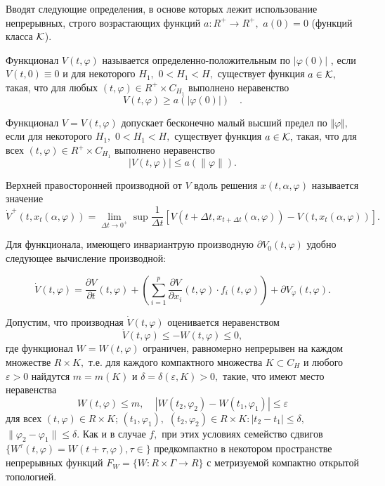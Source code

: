 	Вводят следующие
	определения, в основе которых лежит использование непрерывных,
	строго возрастающих функций
	$a:R^+\to R^+,$ $a(0)=0$ (функций класса $\cal K$).
	
	\begin{definition}\label{d2.9} Функционал $V(t,\varphi )$ называется
		определенно-положительным по $|\varphi(0)|$ , если $V(t,0)\equiv 0$ и для некоторого $H_1,$
		$0<H_1<H,$ существует функция $a\in {\cal K},$ такая, что для
		любых $(t,\varphi) \in R^+\times C_{H_1}$ выполнено неравенство $$
		V(t,\varphi )\ge a(|\varphi (0)|)\quad. $$
	\end{definition}
	
	\begin{definition}\label{d2.10} Функционал $V=V(t,\varphi )$ допускает бесконечно
		малый высший предел по $\Vert \varphi \Vert,$ если для некоторого
		$H_1,$ $0<H_1<H,$ существует функция $a\in {\cal K},$ такая, что
		для всех  $(t,\varphi) \in R^+\times C_{H_1}$ выполнено
		неравенство $$ |V(t,\varphi )|\le a(\|\varphi\| ). $$
	\end{definition}
	
	Верхней правосторонней производной от $V$ вдоль решения $x(t,\alpha,\varphi )$
	называется значение \cite{kra591, hei84}
	\begin{equation}\label{der42}
	\dot V^+(t,x_t(\alpha,\varphi ))=\lim\limits_{\Delta t\to
		0^+}\sup\frac1{\Delta t}\left[ V(t+\Delta t,x_{t+\Delta t}(\alpha
	,\varphi ))-V(t,x_t(\alpha,\varphi ))\right].
	\end{equation}
	
	Для функционала, имеющего инвариантрую производную $\partial V_0 (t, \varphi)$ удобно следующее вычисление производной:
	
	\begin{equation}\label{1.3}
	\dot V(t,\varphi)=\frac{\partial V}{\partial t}(t,\varphi)+
	\left( \sum\limits_{i=1}^p\frac{\partial V}{\partial
		x_i}(t,\varphi )\cdot f_i(t,\varphi )\right) +\partial
	V_{\varphi}(t,\varphi ).
	\end{equation}

Допустим, что производная $\dot V(t,\varphi )$ оценивается неравенством
\begin{equation}
\dot V(t,\varphi )\le -W(t,\varphi )\le 0, \label{3.3'}
\end{equation}
где функционал $W=W(t,\varphi )$ ограничен, равномерно непрерывен
на каждом множестве $R \times K,$ т.е. для каждого компактного
множества $K\subset C_H$ и любого $\varepsilon >0$ найдутся
$m=m(K)$ и $\delta =\delta (\varepsilon ,K)>0,$ такие, что имеют
место неравенства
\begin{equation}
W(t,\varphi )\le m,\ \ \ \ \ |W(t_2,\varphi _2)-W(t_1,\varphi
_1)|\le\varepsilon \label{3.4'}
\end{equation}
для всех $(t,\varphi )\in R \times K$; $(t_1,\varphi _1),$
$(t_2,\varphi _2)\in R \times K : |t_2-t_1|\le \delta,$
$\|\varphi _2-\varphi _1\|\le\delta.$
Как и в случае $f,$ при этих  условиях семейство сдвигов $\{
W^{\tau }(t,\varphi )=W(t+\tau ,\varphi ), \tau\in \}$
предкомпактно в некотором пространстве непрерывных функций
$F_{W}=\{ W : R\times\Gamma\to R\}$  с метризуемой компактно
открытой топологией.

